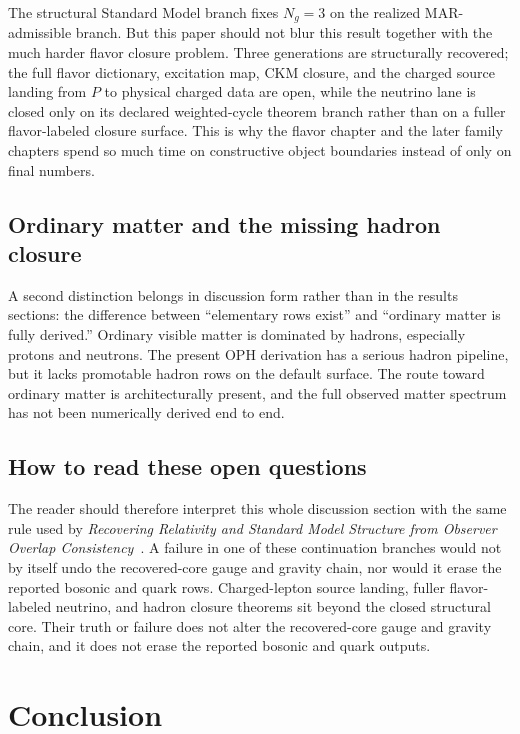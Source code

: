 \documentclass[11pt]{article}
\begin{document}
The structural Standard Model branch fixes \(N_g=3\) on the realized MAR-admissible
branch. But this paper should not blur this result together with the much harder flavor
closure problem. Three generations are structurally recovered; the full flavor dictionary,
excitation map, CKM closure, and the charged source landing from \(P\) to physical charged data are open, while the neutrino
lane is closed only on its declared weighted-cycle theorem branch rather than on a fuller
flavor-labeled closure surface.
This is why the flavor chapter and the later family chapters spend so much time on
constructive object boundaries instead of only on final numbers.

\subsection{Ordinary matter and the missing hadron closure}

A second distinction belongs in discussion form rather than in the results sections: the
difference between ``elementary rows exist'' and ``ordinary matter is fully derived.'' Ordinary
visible matter is dominated by hadrons, especially protons and neutrons. The present OPH
derivation has a serious hadron pipeline, but it lacks promotable hadron rows on the
default surface. The route toward ordinary matter is architecturally present, and the full
observed matter spectrum has not been numerically derived end to end.

\subsection{How to read these open questions}

The reader should therefore interpret this whole discussion section with the same rule used by
\emph{Recovering Relativity and Standard Model Structure from Observer Overlap Consistency}~\cite{ophcompact}. A failure in one of these continuation branches would not by itself undo the
recovered-core gauge and gravity chain, nor would it erase the reported bosonic and quark
rows. Charged-lepton source landing, fuller flavor-labeled neutrino, and hadron closure theorems sit beyond the
closed structural core. Their truth or failure does not alter the recovered-core gauge and
gravity chain, and it does not erase the reported bosonic and quark outputs.

\section{Conclusion}
\end{document}
